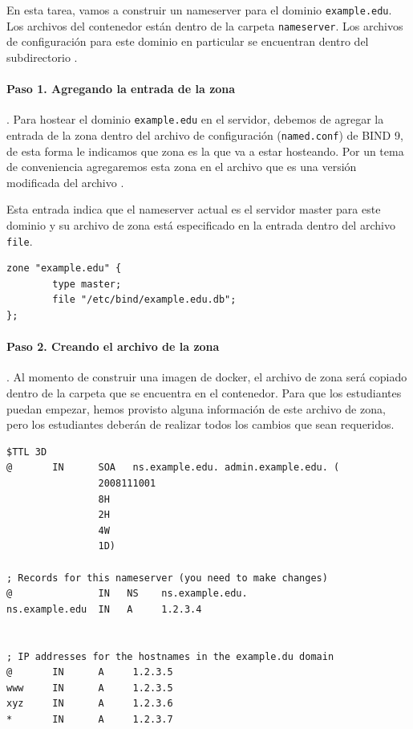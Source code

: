 En esta tarea, vamos a construir un nameserver para el dominio \texttt{example.edu}. Los archivos del contenedor están dentro de la carpeta \texttt{nameserver}. 
Los archivos de configuración para este dominio en particular se encuentran dentro del subdirectorio .

\paragraph{Paso 1. Agregando la entrada de la zona}. Para hostear el dominio \texttt{example.edu} en el servidor, debemos de agregar la entrada de la zona dentro del archivo de configuración (\texttt{named.conf}) de BIND 9, de esta forma le indicamos que zona es la que va a estar hosteando. Por un tema de conveniencia agregaremos esta zona en el archivo  que es una versión modificada del archivo .

Esta entrada indica que el nameserver actual es el servidor master para este dominio y su archivo de zona está especificado en la entrada dentro del archivo \texttt{file}.


\begin{lstlisting}
zone "example.edu" {
        type master;
        file "/etc/bind/example.edu.db";
};
\end{lstlisting}


\paragraph{Paso 2. Creando el archivo de la zona}. 
Al momento de construir una imagen de docker, el archivo de zona  será copiado dentro de la carpeta  que se encuentra en el contenedor.
Para que los estudiantes puedan empezar, hemos provisto alguna información de este archivo de zona, pero los estudiantes deberán de realizar todos los cambios que sean requeridos.

\begin{lstlisting}
$TTL 3D
@       IN      SOA   ns.example.edu. admin.example.edu. (
                2008111001
                8H
                2H
                4W
                1D)

; Records for this nameserver (you need to make changes)
@               IN   NS    ns.example.edu.
ns.example.edu  IN   A     1.2.3.4


; IP addresses for the hostnames in the example.du domain
@       IN      A     1.2.3.5
www     IN      A     1.2.3.5
xyz     IN      A     1.2.3.6
*       IN      A     1.2.3.7
\end{lstlisting}
 


